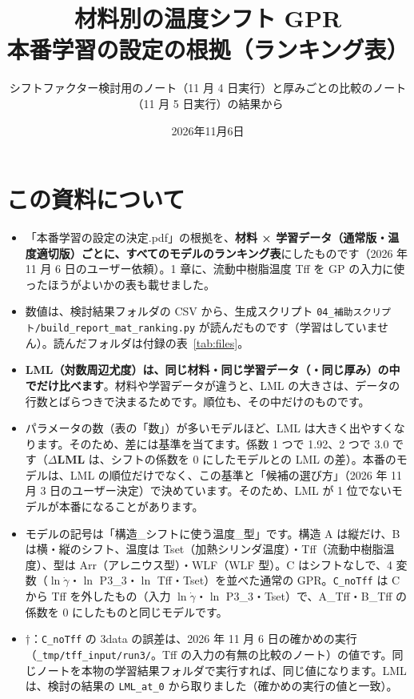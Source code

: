 \documentclass[paper=a4paper,landscape,fontsize=10pt,line_length=62zw,number_of_lines=34]{jlreq}
\title{材料別の温度シフト GPR\\本番学習の設定の根拠（ランキング表）}
\author{シフトファクター検討用のノート（11 月 4 日実行）と厚みごとの比較のノート（11 月 5 日実行）の結果から}
\date{2026年11月6日}
\let\origtextbf\textbf
\renewcommand{\textbf}[1]{\origtextbf{\gtfamily #1}}   %
\begin{document}
\maketitle

\section*{この資料について}
\begin{itemize}[itemsep=0.2ex,topsep=0.3ex]
\item 「本番学習の設定の決定.pdf」の根拠を、\textbf{材料 × 学習データ（通常版・温度適切版）ごとに、すべてのモデルのランキング表}にしたものです（2026 年 11 月 6 日のユーザー依頼）。1 章に、流動中樹脂温度 Tff を GP の入力に使ったほうがよいかの表も載せました。
\item 数値は、検討結果フォルダの CSV から、生成スクリプト \texttt{04\_\allowbreak{}補助スクリプト/\allowbreak{}build\_\allowbreak{}report\_\allowbreak{}mat\_\allowbreak{}ranking.py} が読んだものです（学習はしていません）。読んだフォルダは付録の表~\ref{tab:files}。
\item \textbf{LML（対数周辺尤度）は、同じ材料・同じ学習データ（・同じ厚み）の中でだけ比べます}。材料や学習データが違うと、LML の大きさは、データの行数とばらつきで決まるためです。順位も、その中だけのものです。
\item パラメータの数（表の「数」）が多いモデルほど、LML は大きく出やすくなります。そのため、差には基準を当てます。係数 1 つで 1.92、2 つで 3.0 です（\textbf{$\Delta$LML} は、シフトの係数を 0 にしたモデルとの LML の差）。本番のモデルは、LML の順位だけでなく、この基準と「候補の選び方」（2026 年 11 月 3 日のユーザー決定）で決めています。そのため、LML が 1 位でないモデルが本番になることがあります。
\item モデルの記号は「構造\_シフトに使う温度\_型」です。構造 A は縦だけ、B は横・縦のシフト、温度は Tset（加熱シリンダ温度）・Tff（流動中樹脂温度）、型は Arr（アレニウス型）・WLF（WLF 型）。C はシフトなしで、4 変数（$\ln\dot\gamma$・$\ln$ P3\_3・$\ln$ Tff・Tset）を並べた通常の GPR。\texttt{C\_\allowbreak{}noTff} は C から Tff を外したもの（入力 $\ln\dot\gamma$・$\ln$ P3\_3・Tset）で、A\_Tff・B\_Tff の係数を 0 にしたものと同じモデルです。
\item {}†：\texttt{C\_\allowbreak{}noTff} の 3data の誤差は、2026 年 11 月 6 日の確かめの実行（\texttt{\_\allowbreak{}tmp/\allowbreak{}tff\_\allowbreak{}input/\allowbreak{}run3/\allowbreak{}}。Tff の入力の有無の比較のノート）の値です。同じノートを本物の学習結果フォルダで実行すれば、同じ値になります。LML は、検討の結果の \texttt{LML\_\allowbreak{}at\_\allowbreak{}0} から取りました（確かめの実行の値と一致）。
\end{itemize}
\end{document}

